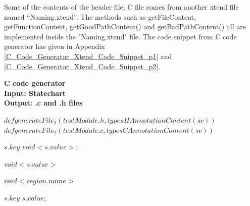 Some of the contents of the header file, C file comes from another xtend file named \enquote{Naming.xtend}. The methods such as getFileContent, getFunctionContent, getGoodPathContent() and getBadPathContent() all are implemented inside the "Naming.xtend" file. The code snippet from C code generator has given in Appendix \ref{C_Code_Generator_Xtend_Code_Snippet_p1} and \ref{C_Code_Generator_Xtend_Code_Snippet_p2}.
\begin{algorithm}
	\label{Algorithm:C_Code_Generator}
	{\textbf{C code generator}}\\
	\noindent\makebox[\linewidth]{\rule{\textwidth}{0.4pt}}
	{\textbf{Input: Statechart}} \\
	{\textbf{Output: .c and .h files}}
	\begin{algorithmic}[1]
	
		
			\State $def {generateFile_1} (testModule.h, typesHAnnotationContent(sc)) $ 
			\State $def {generateFile_2} (testModule.c, typesCAnnotationContent(sc)) $  
		\EndFunction
		
		 		
			 
				 
					\State $s.key$
				 
					\State $ void <s.value>;$
				\EndIf		
			\EndFor			
		\EndFunction
		
		 
		
			 
				\State $void <s.value> {}$
			\EndIf		
		\EndFor
			
			 
			\State $void <region.name>$
				
					
						  
							\State $s.key$
							\State $s.value;$
						\EndIf
					

\end{algorithmic}
\end{algorithm}
